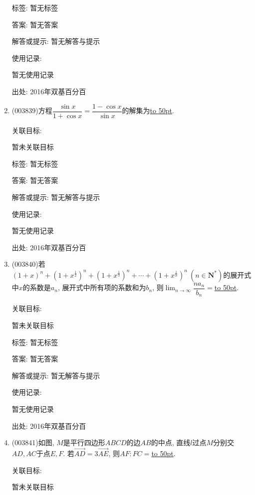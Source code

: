 \documentclass[10pt,a4paper]{article}
\newcommand{\blank}[1]{\underline{\hbox to #1pt{}}}
\begin{document}
\begin{enumerate}[1.]
标签: 暂无标签

答案: 暂无答案

解答或提示: 暂无解答与提示

使用记录:

暂无使用记录


出处: 2016年双基百分百
\item { (003839)}方程$\dfrac{\sin x}{1+\cos x}=\dfrac{1-\cos x}{\sin x}$的解集为\blank{50}.


关联目标:

暂未关联目标



标签: 暂无标签

答案: 暂无答案

解答或提示: 暂无解答与提示

使用记录:

暂无使用记录


出处: 2016年双基百分百
\item { (003840)}若$(1+x)^n+\left(1+x^\frac 12\right)^n+\left(1+x^\frac 13\right)^n+\cdots+\left(1+x^\frac 1n\right)^n \ (n\in \mathbf{N}^*)$的展开式中$x$的系数是$a_n$, 展开式中所有项的系数和为$b_n$, 则$\displaystyle\lim_{n\to \infty}\dfrac{na_n}{b_n}=$\blank{50}.


关联目标:

暂未关联目标



标签: 暂无标签

答案: 暂无答案

解答或提示: 暂无解答与提示

使用记录:

暂无使用记录


出处: 2016年双基百分百
\item { (003841)}如图, $M$是平行四边形$ABCD$的边$AB$的中点, 直线$l$过点$M$分别交$AD,AC$于点$E,F$. 若$\overrightarrow{AD}=3\overrightarrow{AE}$, 则$AF:FC=$\blank{50}.
\begin{center}
\end{center}


关联目标:

暂未关联目标




\end{enumerate}
\end{document}
